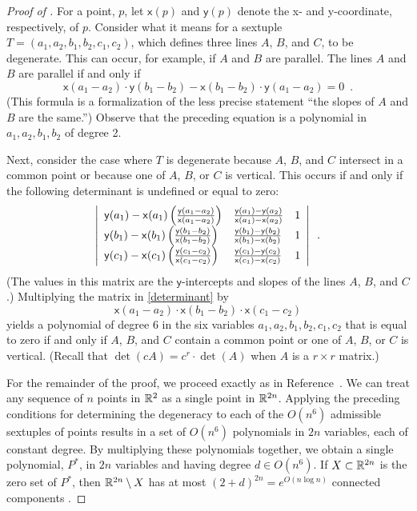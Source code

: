 \documentclass{patmorin}
\newcommand{\x}{\mathsf{x}}
\newcommand{\y}{\mathsf{y}}
\renewcommand{\note}[1]{}
\begin{document}
\begin{proof}[Proof of ]
   For a point, $p$, let $\x(p)$ and $\y(p)$ denote the x- and
   y-coordinate, respectively, of $p$.  Consider what it means for a
   sextuple $T=(a_1,a_2,b_1,b_2,c_1,c_2)$, which defines three lines
   $A$, $B$, and $C$, to be degenerate.  This can occur, for example,
   if $A$ and $B$ are parallel.  The lines $A$ and $B$ are parallel if
   and only if
   \[
      \x(a_1-a_2)\cdot \y(b_1-b_2) - 
       \x(b_1-b_2)\cdot \y(a_1-a_2) = 0 \enspace .
   \]
   (This formula is a formalization of the less precise statement
   ``the slopes of $A$ and $B$ are the same.'')
   Observe that the preceding equation is a polynomial in
   $a_1,a_2,b_1,b_2$ of degree 2.

   Next, consider the case where $T$ is degenerate because $A$, $B$, and
   $C$ intersect in a common point or because one of $A$, $B$, or $C$
   is vertical.  This occurs if and only if the following determinant
   is undefined or equal to zero:
   \begin{equation}
   \left|\begin{array}{lll}
   \y(a_1)-\x(a_1)\left(\frac{\y(a_1-a_2)}{\x(a_1-a_2)}\right) & \frac{\y(a_1)-\y(a_2)}{\x(a_1)-\x(a_2)} & 1 \\
   \y(b_1)-\x(b_1)\left(\frac{\y(b_1-b_2)}{\x(b_1-b_2)}\right) & \frac{\y(b_1)-\y(b_2)}{\x(b_1)-\x(b_2)}  & 1 \\
   \y(c_1)-\x(c_1)\left(\frac{\y(c_1-c_2)}{\x(c_1-c_2)}\right) & \frac{\y(c_1)-\y(c_2)}{\x(c_1)-\x(c_2)}  & 1 \\
   \end{array}\right| \enspace .
   \eqlabel{determinant}
   \end{equation}
   (The values in this matrix are the $\y$-intercepts and slopes of the
   lines $A$, $B$, and $C$.)
   Multiplying the matrix in \eqref{determinant} by 
   \[
      \x(a_1-a_2)\cdot
      \x(b_1-b_2)\cdot
      \x(c_1-c_2)
   \]
   yields a polynomial of degree $6$ in the six variables
   $a_1,a_2,b_1,b_2,c_1,c_2$ that is equal to zero if and only if $A$,
   $B$, and $C$ contain a common point or one of $A$, $B$, or $C$
   is vertical. (Recall that $\det(cA)=c^r\cdot\det(A)$ when $A$ is a
   $r\times r$ matrix.)

   For the remainder of the proof, we proceed exactly as in
   Reference~\cite{goodman.pollack:upper}.  We can treat any sequence of $n$
   points in $\mathbb{R}^2$ as a single point in $\mathbb{R}^{2n}$.  Applying the
   preceding conditions for determining the degeneracy to each of
   the $O(n^6)$ admissible sextuples of points results in a set of
   $O(n^6)$ polynomials in $2n$ variables, each of constant degree.
   By multiplying these polynomials together, we obtain a single
   polynomial, $P^*$, in $2n$ variables and having degree $d\in O(n^6)$.
   If $X\subset\mathbb{R}^{2n}$ is the zero set of $P^*$, then $\mathbb{R}^{2n}\setminus
   X$ has at most $(2+d)^{2n}=e^{O(n\log n)}$ connected components
   \cite[Lemma~2]{goodman.pollack:upper}.\note{The \# components argument is usually called the Milnor-Thom bound, but it has a long history---see
the footnote on Page 4 here: \url{http://goo.gl/XtpVyR}.}


\end{proof}
\end{document}
